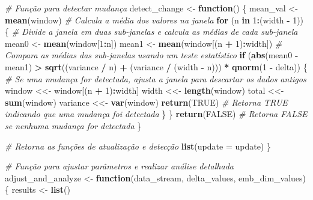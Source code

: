 \documentclass[
]{article}
\newenvironment{Shaded}{\begin{snugshade}}{\end{snugshade}}
\newcommand{\AttributeTok}[1]{\textcolor[rgb]{0.13,0.29,0.53}{#1}}
\newcommand{\CommentTok}[1]{\textcolor[rgb]{0.56,0.35,0.01}{\textit{#1}}}
\newcommand{\ConstantTok}[1]{\textcolor[rgb]{0.56,0.35,0.01}{#1}}
\newcommand{\ControlFlowTok}[1]{\textcolor[rgb]{0.13,0.29,0.53}{\textbf{#1}}}
\newcommand{\DecValTok}[1]{\textcolor[rgb]{0.00,0.00,0.81}{#1}}
\newcommand{\FunctionTok}[1]{\textcolor[rgb]{0.13,0.29,0.53}{\textbf{#1}}}
\newcommand{\NormalTok}[1]{#1}
\newcommand{\OtherTok}[1]{\textcolor[rgb]{0.56,0.35,0.01}{#1}}
\newcommand{\SpecialCharTok}[1]{\textcolor[rgb]{0.81,0.36,0.00}{\textbf{#1}}}
\begin{document}
\begin{Shaded}
\begin{Highlighting}[]
  \CommentTok{\# Função para detectar mudança}
\NormalTok{  detect\_change }\OtherTok{\textless{}{-}} \ControlFlowTok{function}\NormalTok{() \{}
\NormalTok{    mean\_val }\OtherTok{\textless{}{-}} \FunctionTok{mean}\NormalTok{(window) }\CommentTok{\# Calcula a média dos valores na janela}
    \ControlFlowTok{for}\NormalTok{ (n }\ControlFlowTok{in} \DecValTok{1}\SpecialCharTok{:}\NormalTok{(width }\SpecialCharTok{{-}} \DecValTok{1}\NormalTok{)) \{}
      \CommentTok{\# Divide a janela em duas sub{-}janelas e calcula as médias de cada sub{-}janela}
\NormalTok{      mean0 }\OtherTok{\textless{}{-}} \FunctionTok{mean}\NormalTok{(window[}\DecValTok{1}\SpecialCharTok{:}\NormalTok{n])}
\NormalTok{      mean1 }\OtherTok{\textless{}{-}} \FunctionTok{mean}\NormalTok{(window[(n }\SpecialCharTok{+} \DecValTok{1}\NormalTok{)}\SpecialCharTok{:}\NormalTok{width])}
      \CommentTok{\# Compara as médias das sub{-}janelas usando um teste estatístico}
      \ControlFlowTok{if}\NormalTok{ (}\FunctionTok{abs}\NormalTok{(mean0 }\SpecialCharTok{{-}}\NormalTok{ mean1) }\SpecialCharTok{\textgreater{}} \FunctionTok{sqrt}\NormalTok{((variance }\SpecialCharTok{/}\NormalTok{ n) }\SpecialCharTok{+}\NormalTok{ (variance }\SpecialCharTok{/}\NormalTok{ (width }\SpecialCharTok{{-}}\NormalTok{ n))) }\SpecialCharTok{*} \FunctionTok{qnorm}\NormalTok{(}\DecValTok{1} \SpecialCharTok{{-}}\NormalTok{ delta)) \{}
        \CommentTok{\# Se uma mudança for detectada, ajusta a janela para descartar os dados antigos}
\NormalTok{        window }\OtherTok{\textless{}\textless{}{-}}\NormalTok{ window[(n }\SpecialCharTok{+} \DecValTok{1}\NormalTok{)}\SpecialCharTok{:}\NormalTok{width]}
\NormalTok{        width }\OtherTok{\textless{}\textless{}{-}} \FunctionTok{length}\NormalTok{(window)}
\NormalTok{        total }\OtherTok{\textless{}\textless{}{-}} \FunctionTok{sum}\NormalTok{(window)}
\NormalTok{        variance }\OtherTok{\textless{}\textless{}{-}} \FunctionTok{var}\NormalTok{(window)}
        \FunctionTok{return}\NormalTok{(}\ConstantTok{TRUE}\NormalTok{) }\CommentTok{\# Retorna TRUE indicando que uma mudança foi detectada}
\NormalTok{      \}}
\NormalTok{    \}}
    \FunctionTok{return}\NormalTok{(}\ConstantTok{FALSE}\NormalTok{) }\CommentTok{\# Retorna FALSE se nenhuma mudança for detectada}
\NormalTok{  \}}
  
  \CommentTok{\# Retorna as funções de atualização e detecção}
  \FunctionTok{list}\NormalTok{(}\AttributeTok{update =}\NormalTok{ update)}
\NormalTok{\}}

\CommentTok{\# Função para ajustar parâmetros e realizar análise detalhada}
\NormalTok{adjust\_and\_analyze }\OtherTok{\textless{}{-}} \ControlFlowTok{function}\NormalTok{(data\_stream, delta\_values, emb\_dim\_values) \{}
\NormalTok{  results }\OtherTok{\textless{}{-}} \FunctionTok{list}\NormalTok{()}
  

\end{Highlighting}
\end{Shaded}
\end{document}
